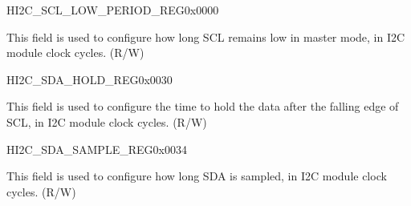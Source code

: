 \begin{register}{H}{I2C\_SCL\_LOW\_PERIOD\_REG}{0x0000}\label{regdesc:I2CSCLLOWPERIODREG}
%
%
\regnewline%
\begin{regdesc}\begin{reglist}
\label{fielddesc:I2CSCLLOWPERIOD}\item [I2C\_SCL\_LOW\_PERIOD] This field is used to configure how long SCL remains low in master mode, in I2C module clock cycles. (R/W)
\end{reglist}\end{regdesc}
\end{register}


\begin{register}{H}{I2C\_SDA\_HOLD\_REG}{0x0030}\label{regdesc:I2CSDAHOLDREG}
%
%
\regnewline%
\begin{regdesc}\begin{reglist}
\label{fielddesc:I2CSDAHOLDTIME}\item [I2C\_SDA\_HOLD\_TIME] This field is used to configure the time to hold the data after the falling
edge of SCL, in I2C module clock cycles. (R/W)
\end{reglist}\end{regdesc}
\end{register}


\begin{register}{H}{I2C\_SDA\_SAMPLE\_REG}{0x0034}\label{regdesc:I2CSDASAMPLEREG}
%
%
\regnewline%
\begin{regdesc}\begin{reglist}
\label{fielddesc:I2CSDASAMPLETIME}\item [I2C\_SDA\_SAMPLE\_TIME] This field is used to configure how long SDA is sampled, in I2C module clock cycles. (R/W)
\end{reglist}\end{regdesc}
\end{register}



